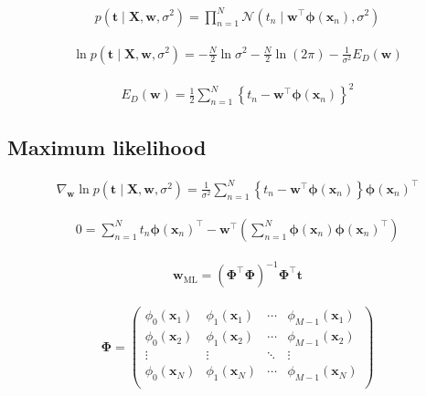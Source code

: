\documentclass{article}
\begin{document}
\begin{align*}
p(\mathbf{t} \mid \mathbf{X}, \mathbf{w}, \sigma^2) = \prod_{n=1}^{N} \mathcal{N} \left( t_n \mid \mathbf{w}^{\top} \boldsymbol{\phi}(\mathbf{x}_n), \sigma^2 \right)
\tag{4.9}
\end{align*}

\begin{align*}
\ln p(\mathbf{t} \mid \mathbf{X}, \mathbf{w}, \sigma^2) = -\frac{N}{2} \ln \sigma^2 - \frac{N}{2} \ln (2 \pi) - \frac{1}{\sigma^2} E_D(\mathbf{w})
\tag{4.10}
\end{align*}

\begin{align*}
E_D(\mathbf{w}) = \frac{1}{2} \sum_{n=1}^{N} \left\{ t_n - \mathbf{w}^{\top} \boldsymbol{\phi}(\mathbf{x}_n) \right\}^2
\tag{4.11}
\end{align*}

\subsection{Maximum likelihood}

\begin{align*}
\nabla_{\mathbf{w}} \ln p(\mathbf{t} \mid \mathbf{X}, \mathbf{w}, \sigma^2) = \frac{1}{\sigma^2} \sum_{n=1}^{N} \left\{ t_n - \mathbf{w}^{\top} \boldsymbol{\phi}(\mathbf{x}_n) \right\} \boldsymbol{\phi}(\mathbf{x}_n)^{\top}
\tag{4.12}
\end{align*}

\begin{align*}
0 = \sum_{n=1}^{N} t_n \boldsymbol{\phi}(\mathbf{x}_n)^{\top} - \mathbf{w}^{\top} \left( \sum_{n=1}^{N} \boldsymbol{\phi}(\mathbf{x}_n) \boldsymbol{\phi}(\mathbf{x}_n)^{\top} \right)
\tag{4.13}
\end{align*}

\begin{align*}
\mathbf{w}_{\mathrm{ML}} = \left( \boldsymbol{\Phi}^{\top} \boldsymbol{\Phi} \right)^{-1} \boldsymbol{\Phi}^{\top} \mathbf{t}
\tag{4.14}
\end{align*}

\begin{align*}
\boldsymbol{\Phi} = \left( \begin{array}{cccc}
\phi_0(\mathbf{x}_1) & \phi_1(\mathbf{x}_1) & \cdots & \phi_{M-1}(\mathbf{x}_1) \\
\phi_0(\mathbf{x}_2) & \phi_1(\mathbf{x}_2) & \cdots & \phi_{M-1}(\mathbf{x}_2) \\
\vdots & \vdots & \ddots & \vdots \\
\phi_0(\mathbf{x}_N) & \phi_1(\mathbf{x}_N) & \cdots & \phi_{M-1}(\mathbf{x}_N) \\
\end{array} \right)
\tag{4.15}
\end{align*}
\end{document}
